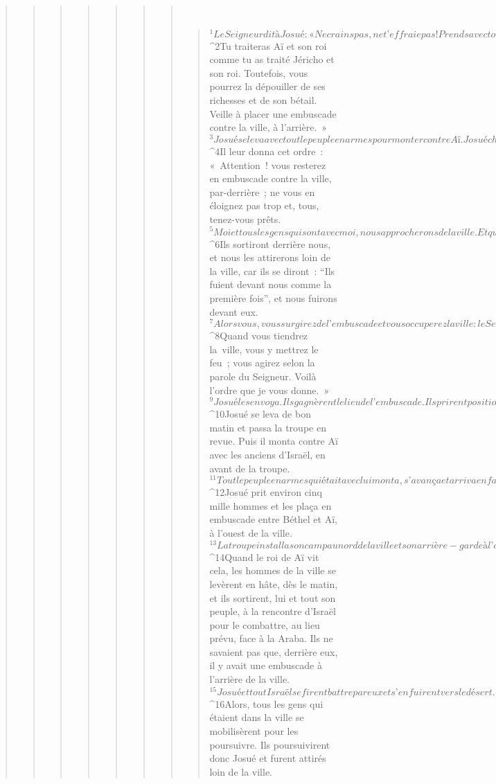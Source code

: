 \begin{verse}
\begin{verse}
\begin{verse}
\begin{verse}
\begin{verse}
\begin{verse}
\begin{verse}
         
      \bchapter{}
      \begin{verse}
${}^{1}Le Seigneur dit à Josué : « Ne crains pas, ne t’effraie pas ! Prends avec toi tout le peuple en armes. Lève-toi, monte vers la ville de Aï ! Regarde : je livre entre tes mains le roi de Aï, son peuple, sa ville et son pays. 
${}^{2}Tu traiteras Aï et son roi comme tu as traité Jéricho et son roi. Toutefois, vous pourrez la dépouiller de ses richesses et de son bétail. Veille à placer une embuscade contre la ville, à l’arrière. »
${}^{3}Josué se leva avec tout le peuple en armes pour monter contre Aï. Josué choisit trente mille hommes, des guerriers de valeur. Il les fit partir de nuit. 
${}^{4}Il leur donna cet ordre : « Attention ! vous resterez en embuscade contre la ville, par-derrière ; ne vous en éloignez pas trop et, tous, tenez-vous prêts. 
${}^{5}Moi et tous les gens qui sont avec moi, nous approcherons de la ville. Et quand ils sortiront à notre rencontre comme la première fois, nous fuirons devant eux. 
${}^{6}Ils sortiront derrière nous, et nous les attirerons loin de la ville, car ils se diront : “Ils fuient devant nous comme la première fois”, et nous fuirons devant eux. 
${}^{7}Alors vous, vous surgirez de l’embuscade et vous occuperez la ville : le Seigneur votre Dieu la livre entre vos mains. 
${}^{8}Quand vous tiendrez la ville, vous y mettrez le feu ; vous agirez selon la parole du Seigneur. Voilà l’ordre que je vous donne. »
${}^{9}Josué les envoya. Ils gagnèrent le lieu de l’embuscade. Ils prirent position entre Béthel et Aï, à l’ouest de Aï. Josué passa cette nuit-là au milieu de la troupe. 
${}^{10}Josué se leva de bon matin et passa la troupe en revue. Puis il monta contre Aï avec les anciens d’Israël, en avant de la troupe. 
${}^{11}Tout le peuple en armes qui était avec lui monta, s’avança et arriva en face de la ville. Ils campèrent au nord de Aï. Entre Aï et Josué, il y avait un vallon. 
${}^{12}Josué prit environ cinq mille hommes et les plaça en embuscade entre Béthel et Aï, à l’ouest de la ville. 
${}^{13}La troupe installa son camp au nord de la ville et son arrière-garde à l’ouest de la ville. Josué passa cette nuit-là au milieu de la vallée.
${}^{14}Quand le roi de Aï vit cela, les hommes de la ville se levèrent en hâte, dès le matin, et ils sortirent, lui et tout son peuple, à la rencontre d’Israël pour le combattre, au lieu prévu, face à la Araba. Ils ne savaient pas que, derrière eux, il y avait une embuscade à l’arrière de la ville. 
${}^{15}Josué et tout Israël se firent battre par eux et s’enfuirent vers le désert. 
${}^{16}Alors, tous les gens qui étaient dans la ville se mobilisèrent pour les poursuivre. Ils poursuivirent donc Josué et furent attirés loin de la ville. 

\end{verse}
\end{verse}
\end{verse}
\end{verse}
\end{verse}
\end{verse}
\end{verse}
\end{verse}
